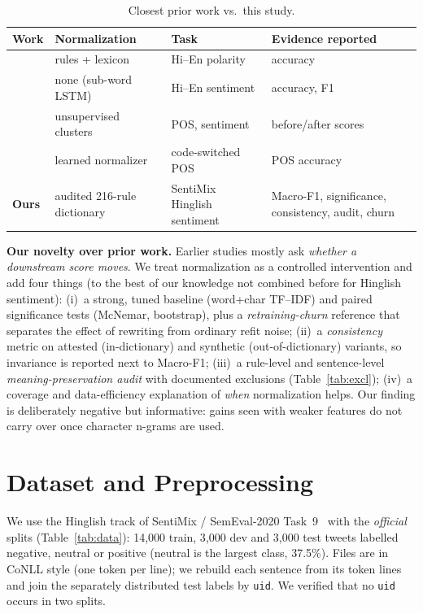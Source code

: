 \documentclass[10pt,twocolumn,letterpaper]{article}
\begin{document}
\begin{table}[t]\centering\footnotesize\setlength{\tabcolsep}{2.5pt}
\begin{tabular}{@{}>{\raggedright\arraybackslash}p{0.8cm}>{\raggedright\arraybackslash}p{2.0cm}>{\raggedright\arraybackslash}p{2.0cm}>{\raggedright\arraybackslash}p{2.35cm}@{}}
\toprule
Work & Normalization & Task & Evidence reported\\
\midrule
\cite{sharma2015text} & rules + lexicon & Hi--En polarity & accuracy\\
\cite{joshi2016subword} & none (sub-word LSTM) & Hi--En sentiment & accuracy, F1\\
\cite{singh2018automatic} & unsupervised clusters & POS, sentiment & before/after scores\\
\cite{vandergoot2021lexical} & learned normalizer & code-switched POS & POS accuracy\\
\textbf{Ours} & audited 216-rule dictionary & SentiMix Hinglish sentiment & Macro-F1, significance, consistency, audit, churn\\
\bottomrule
\end{tabular}
\caption{Closest prior work vs.\ this study.}\label{tab:lit}
\end{table}
\textbf{Our novelty over prior work.} Earlier studies mostly ask \emph{whether a downstream score moves}. We treat normalization as a controlled intervention and add four things (to the best of our knowledge not combined before for Hinglish sentiment): (i)~a strong, tuned baseline (word+char TF--IDF) and paired significance tests (McNemar, bootstrap), plus a \emph{retraining-churn} reference that separates the effect of rewriting from ordinary refit noise; (ii)~a \emph{consistency} metric on attested (in-dictionary) and synthetic (out-of-dictionary) variants, so invariance is reported next to Macro-F1; (iii)~a rule-level and sentence-level \emph{meaning-preservation audit} with documented exclusions (Table~\ref{tab:excl}); (iv)~a coverage and data-efficiency explanation of \emph{when} normalization helps. Our finding is deliberately negative but informative: gains seen with weaker features do not carry over once character n-grams are used.

\section{Dataset and Preprocessing}
\label{sec:data}
We use the Hinglish track of SentiMix / SemEval-2020 Task~9~\cite{patwa2020semeval} with the \emph{official} splits (Table~\ref{tab:data}): 14{,}000 train, 3{,}000 dev and 3{,}000 test tweets labelled negative, neutral or positive (neutral is the largest class, 37.5\%). Files are in CoNLL style (one token per line); we rebuild each sentence from its token lines and join the separately distributed test labels by \texttt{uid}. We verified that no \texttt{uid} occurs in two splits.
\begin{table}[t]\centering\footnotesize\setlength{\tabcolsep}{4pt}

\caption{SentiMix Hinglish class distribution per split.}\label{tab:data}
\end{table}
\end{document}
